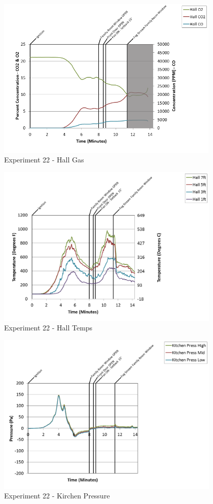 \documentclass{article}
\begin{document}
\begin{appendices}
\begin{figure}[h!]
	\centering
	\includegraphics[height=3.05in]{0_Images/Results_Charts/Exp_22_Charts/HallGas.png}
	\caption{Experiment 22 - Hall Gas}
\end{figure}

\clearpage

\begin{figure}[h!]
	\centering
	\includegraphics[height=3.05in]{0_Images/Results_Charts/Exp_22_Charts/HallTemps.png}
	\caption{Experiment 22 - Hall Temps}
\end{figure}


\begin{figure}[h!]
	\centering
	\includegraphics[height=3.05in]{0_Images/Results_Charts/Exp_22_Charts/KirchenPressure.png}
	\caption{Experiment 22 - Kirchen Pressure}
\end{figure}


\end{appendices}
\end{document}
